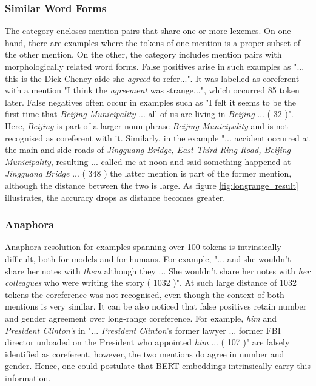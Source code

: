 \documentclass[11pt]{article}
\begin{document}
\subsubsection{Similar Word Forms} 
The category encloses mention pairs that share one or more lexemes. On one hand, there are examples where the tokens of one mention is a proper subset of the other mention. On the other, the category includes mention pairs with morphologically related word forms.
False positives arise in such examples as "... this is the Dick Cheney aide she \textit{agreed} to refer...". It was labelled as coreferent with a mention "I think the \textit{agreement} was strange...", which occurred 85 token later. 
False negatives often occur in examples such as "I felt it seems to be the first time that \textit{Beijing Municipality} ... all of us are living in \textit{Beijing} ... ( 32 )". Here, \textit{Beijing} is part of a larger noun phrase \textit{Beijing Municipality} and is not recognised as coreferent with it. Similarly, in the example "... accident occurred at the main and side roads of \textit{Jingguang Bridge, East Third Ring Road, Beijing Municipality}, resulting ... called me at noon and said something happened at \textit{Jingguang Bridge} ... ( 348 ) the latter mention is part of the former mention, although the distance between the two is large. As figure \ref{fig:longrange_result} illustrates, the accuracy drops as distance becomes greater.

\subsubsection{Anaphora}

Anaphora resolution for examples spanning over 100 tokens is intrinsically difficult, both for models and for humans. For example, "... and she wouldn't share her notes with \textit{them} although they ... She wouldn't share her notes with \textit{her colleagues} who were writing the story ( 1032 )". At such large distance of 1032 tokens the coreference was not recognised, even though the context of both mentions is very similar. It can be also noticed that false positives retain number and gender agreement over long-range coreference. For example, \textit{him} and \textit{President Clinton's} in "... \textit{President Clinton}'s former lawyer ... former FBI director unloaded on the President who appointed \textit{him} ... ( 107 )" are falsely identified as coreferent, however, the two mentions do agree in number and gender. Hence, one could postulate that BERT embeddings intrinsically carry this information. 
\end{document}
